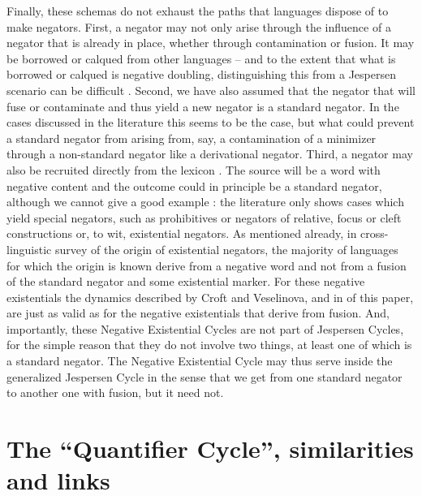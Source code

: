 ﻿\documentclass[output=paper]{langsci/langscibook}
\begin{document}
Finally, these schemas do not exhaust the paths that languages dispose of
to make negators. First, a negator may not only arise through the influence
of a negator that is already in place, whether through contamination or
fusion. It may be borrowed or calqued from other languages – and to the
extent that what is borrowed or calqued is negative doubling,
distinguishing this from a Jespersen scenario can be difficult 
\parencite[cp.][]{AuweraVossen2015}. Second, we have also assumed that the
negator
that will fuse or contaminate and thus yield a new negator is a standard
negator. In the cases discussed in the literature this seems to be the
case, but what could prevent a standard negator from arising from, say, a
contamination of a minimizer through a non-standard negator like a
derivational negator. Third, a negator may also be recruited directly from
the lexicon \parencite[cp.][74]{Auwera2010}. The source will be a
word with negative content and the outcome could in principle be a standard
negator, although we cannot give a good example
\parencite[cp.][75, 90--91]{Auwera2010}: the literature
\parencite[e.g.][292--339]{Gelderen2011} only shows cases which yield special
negators, such as prohibitives or negators of relative, focus or cleft
constructions \citep[917]{Givon1973} or, to wit, existential negators. As
mentioned already, in  cross-linguistic survey of
the origin of existential negators, the majority of languages for which the
origin is known derive from a negative word and not from a fusion of the
standard negator and some existential marker. For these negative
existentials the dynamics described by Croft and Veselinova, and in
 of this paper, are just as valid as for the negative
existentials that derive from fusion. And, importantly, these Negative
Existential Cycles are not part of Jespersen Cycles, for the simple reason
that they do not involve two things, at least one of which is a standard
negator. The Negative Existential Cycle may thus serve inside the
generalized Jespersen Cycle in the sense that we get from one standard
negator to another one with fusion, but it need not.

\section{The ``Quantifier Cycle'', similarities and links}\label{sec:int-5}
\end{document}
